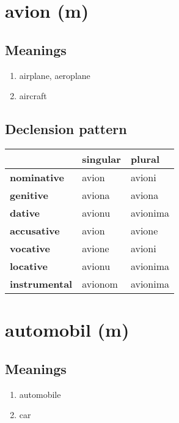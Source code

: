 \filbreak
\section{avion (m)}
\subsection*{Meanings}
\begin{enumerate}
\item airplane, aeroplane
\item aircraft
\end{enumerate}
\subsection*{Declension pattern}
\begin{tabularx}{\linewidth}{Xll}
\toprule
{} & singular &    plural \\
\midrule
\textbf{nominative  } &    avion &    avioni \\
\textbf{genitive    } &   aviona &    aviona \\
\textbf{dative      } &   avionu &  avionima \\
\textbf{accusative  } &    avion &    avione \\
\textbf{vocative    } &   avione &    avioni \\
\textbf{locative    } &   avionu &  avionima \\
\textbf{instrumental} &  avionom &  avionima \\
\bottomrule
\end{tabularx}

\filbreak
\section{automobil (m)}
\subsection*{Meanings}
\begin{enumerate}
\item automobile
\item car
\end{enumerate}

